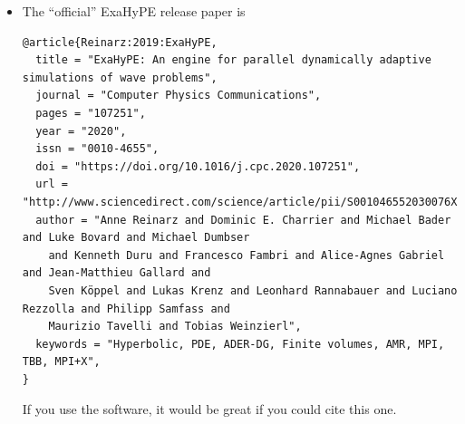 \begin{itemize}
  \item The ``official'' ExaHyPE release paper is
{\tiny \begin{verbatim}
@article{Reinarz:2019:ExaHyPE,   
  title = "ExaHyPE: An engine for parallel dynamically adaptive simulations of wave problems",
  journal = "Computer Physics Communications",
  pages = "107251",
  year = "2020",
  issn = "0010-4655",
  doi = "https://doi.org/10.1016/j.cpc.2020.107251",
  url = "http://www.sciencedirect.com/science/article/pii/S001046552030076X",
  author = "Anne Reinarz and Dominic E. Charrier and Michael Bader and Luke Bovard and Michael Dumbser 
    and Kenneth Duru and Francesco Fambri and Alice-Agnes Gabriel and Jean-Matthieu Gallard and 
    Sven Köppel and Lukas Krenz and Leonhard Rannabauer and Luciano Rezzolla and Philipp Samfass and 
    Maurizio Tavelli and Tobias Weinzierl",
  keywords = "Hyperbolic, PDE, ADER-DG, Finite volumes, AMR, MPI, TBB, MPI+X",
}
  \end{verbatim}}
  If you use the software, it would be great if you could cite this one.
\end{itemize}

